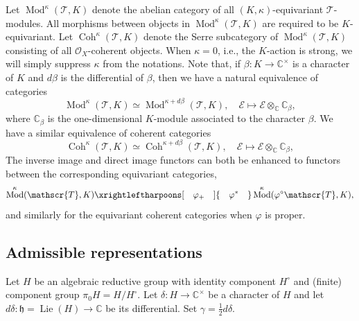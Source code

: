 \documentclass[11pt, a4paper]{amsart}
\newcommand{\C}{\mathbb{C}}
\newcommand{\fh}{\mathfrak{h}}
\newcommand{\cE}{\mathcal{E}}
\DeclareMathOperator{\Lie}{Lie}
\DeclareMathOperator{\Mod}{Mod}
\DeclareMathOperator{\Coh}{Coh}
\newcommand{\TT}{\mathscr{T}}
\newcommand{\cm}{\C^\times}
\newcommand{\OO}{\mathcal{O}}
\theoremstyle{definition}
\numberwithin{equation}{section}
\begin{document}
Let $\Mod^\kappa(\TT,K)$ denote the abelian category of all $(K, \kappa)$-equivariant $\TT$-modules. All morphisms between objects in $\Mod^\kappa(\TT,K)$ are required to be $K$-equivariant.
Let $\Coh^\kappa(\TT,K)$ denote the Serre subcategory of $\Mod^\kappa(\TT,K)$ consisting of all $\OO_X$-coherent objects. When $\kappa = 0$, i.e., the $K$-action is strong, we will simply suppress $\kappa$ from the notations.
Note that, if $\beta: K \to \cm$ is a character of $K$ and $d\beta$ is the differential of $\beta$, then we have a natural equivalence of categories 
\begin{equation} \label{eq:equiv_mod_kappa}
	\Mod^\kappa(\TT,K) \simeq \Mod^{\kappa + d\beta}(\TT,K), \quad \cE \mapsto \cE \otimes_{\C} \C_{\beta}, 
\end{equation}
where $\C_{\beta}$ is the one-dimensional $K$-module associated to the character $\beta$. We have a similar equivalence of coherent categories
\begin{equation} \label{eq:equiv_coherent_kappa}
	\Coh^\kappa(\TT,K) \simeq \Coh^{\kappa + d\beta}(\TT,K), \quad \cE \mapsto \cE \otimes_{\C} \C_{\beta}, 
\end{equation}
The inverse image and direct image functors can both be enhanced to functors between the corresponding equivariant categories,
\[ \Mod^\kappa(\TT,K) \xrightleftharpoons[ \quad\varphi_+\quad ]{\quad\varphi^*\quad} \Mod^\kappa(\varphi^\circ \TT,K), \]
and similarly for the equivariant coherent categories when $\varphi$ is proper.



\subsection{Admissible representations}\label{subsec:adm_repn}

Let $H$ be an algebraic reductive group with identity component $H^\circ$ and (finite) component group $\pi_0 H = H/H^\circ$. Let $\delta: H \to \cm$ be a character of $H$ and let $d \delta: \fh = \Lie(H) \to \C$ be its differential. Set $\gamma = \frac{1}{2} d \delta$. 
\end{document}
